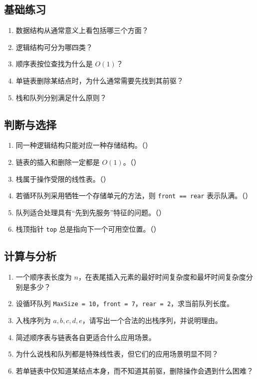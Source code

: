 \documentclass{../../note}
\begin{document}
\subsection{基础练习}

\begin{enumerate}
  \item 数据结构从通常意义上看包括哪三个方面？
  \item 逻辑结构可分为哪四类？
  \item 顺序表按位查找为什么是 $O(1)$？
  \item 单链表删除某结点时，为什么通常需要先找到其前驱？
  \item 栈和队列分别满足什么原则？
\end{enumerate}

\subsection{判断与选择}

\begin{enumerate}
  \item 同一种逻辑结构只能对应一种存储结构。（\hspace{1cm}）
  \item 链表的插入和删除一定都是 $O(1)$。（\hspace{1cm}）
  \item 栈属于操作受限的线性表。（\hspace{1cm}）
  \item 若循环队列采用牺牲一个存储单元的方法，则 \texttt{front == rear} 表示队满。（\hspace{1cm}）
  \item 队列适合处理具有“先到先服务”特征的问题。（\hspace{1cm}）
  \item 栈顶指针 \texttt{top} 总是指向下一个可用空位置。（\hspace{1cm}）
\end{enumerate}

\subsection{计算与分析}

\begin{enumerate}
  \item 一个顺序表长度为 $n$，在表尾插入元素的最好时间复杂度和最坏时间复杂度分别是多少？
  \item 设循环队列 \texttt{MaxSize = 10}，\texttt{front = 7}，\texttt{rear = 2}，求当前队列长度。
  \item 入栈序列为 $a,b,c,d,e$，请写出一个合法的出栈序列，并说明理由。
  \item 简述顺序表与链表各自更适合什么应用场景。
  \item 为什么说栈和队列都是特殊线性表，但它们的应用场景明显不同？
  \item 若单链表中仅知道某结点本身，而不知道其前驱，删除操作会遇到什么困难？
\end{enumerate}
\end{document}
